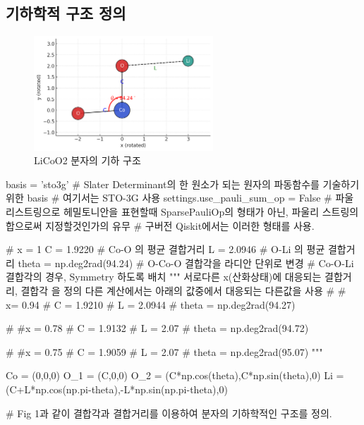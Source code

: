 \documentclass[11pt]{article}
\begin{document}
\subsection{기하학적 구조 정의}
\begin{figure}[h]
  \centering
  \includegraphics[width=0.6\textwidth]{Line Chart.png}
  \caption{LiCoO2 분자의 기하 구조}
  \label{fig:molecule}
\end{figure}
\begin{CodeBox}[title={Example: Python snippet}]
basis = 'sto3g'
# Slater Determinant의 한 원소가 되는 원자의 파동함수를 기술하기 위한 basis
# 여기서는 STO-3G 사용 
settings.use_pauli_sum_op = False
# 파울리스트링으로 헤밀토니안을 표현할때 SparsePauliOp의 형태가 아닌, 파울리 스트링의 합으로써 지정할것인가의 유무
# 구버전 Qiskit에서는 이러한 형태를 사용. 

# x = 1
C = 1.9220
# Co-O 의 평균 결합거리
L = 2.0946
# O-Li 의 평균 결합거리
theta = np.deg2rad(94.24)
# O-Co-O 결합각을 라디안 단위로 변경
# Co-O-Li 결합각의 경우, Symmetry 하도록 배치 
""" 
서로다른 x(산화상태)에 대응되는 결합거리, 결합각 을 정의 
다른 계산에서는 아래의 값중에서 대응되는 다른값을 사용
# # x= 0.94
# C = 1.9210
# L = 2.0944
# theta = np.deg2rad(94.27)

# #x = 0.78
# C = 1.9132
# L = 2.07
# theta = np.deg2rad(94.72)

# #x = 0.75
# C = 1.9059
# L = 2.07
# theta = np.deg2rad(95.07)
"""

Co = (0,0,0)
O_1 = (C,0,0)
O_2 = (C*np.cos(theta),C*np.sin(theta),0)
Li = (C+L*np.cos(np.pi-theta),-L*np.sin(np.pi-theta),0)

# Fig 1과 같이 결합각과 결합거리를 이용하여 분자의 기하학적인 구조를 정의. 
\end{CodeBox} 

\newpage
\end{document}
